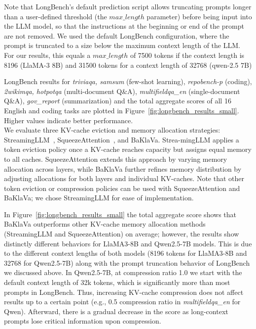 Note that LongBench's default prediction script allows truncating prompts longer than a user-defined threshold (the $max\_length$ parameter) before being input into the LLM model, so that the instructions at the beginning or end of the prompt are not removed. We used the default LongBench configuration, where the prompt is truncated to a size below the maximum context length of the LLM. For our results, this equals a $max\_length$ of 7500 tokens if the context length is 8196 (LlaMA-3 8B) and 31500 tokens for a context length of 32768 (qwen-2.5 7B)%



LongBench results for \textit{triviaqa, samsum} (few-shot learning), \textit{repobench-p} (coding), \textit{2wikimqa, hotpotqa} (multi-document Q\&A), \textit{multifieldqa\_en} (single-document Q\&A), \textit{gov\_report} (summarization) and the total aggregate scores of all 16 English and coding tasks are plotted in Figure~\ref{fig:longbench_results_small}. Higher values indicate better performance.  
\\
We evaluate three KV-cache eviction and memory allocation strategies: StreamingLLM~\cite{streamingllm}, SqueezeAttention~\cite{squeezeattention}, and BaKlaVa. Strea-mingLLM applies a token eviction policy once a KV-cache reaches capacity but assigns equal memory to all caches. SqueezeAttention extends this approach by varying memory allocation across layers, while BaKlaVa further refines memory distribution by adjusting allocations for both layers and individual KV-caches. Note that other token eviction or compression policies can be used with SqueezeAttention and BaKlaVa; we chose StreamingLLM for ease of implementation. 

In Figure~\ref{fig:longbench_results_small} the total aggregate score shows that BaKlaVa outperforms other KV-cache memory allocation methods (StreamingLLM and SqueezeAttention) on average; however, the results show distinctly different behaviors for LlaMA3-8B and Qwen2.5-7B models. This is due to the different context lengths of both models (8196 tokens for LlaMA3-8B and 32768 for Qwen2.5-7B) along with the prompt truncation behavior of LongBench we discussed above. In Qwen2.5-7B, at compression ratio 1.0 we start with the default context length of 32k tokens, which is significantly more than most prompts in LongBench. Thus, increasing KV-cache compression does not affect results up to a certain point (e.g., 0.5 compression ratio in \textit{multifieldqa\_en} for Qwen). Afterward, there is a gradual decrease in the score as long-context prompts lose critical information upon compression. 

